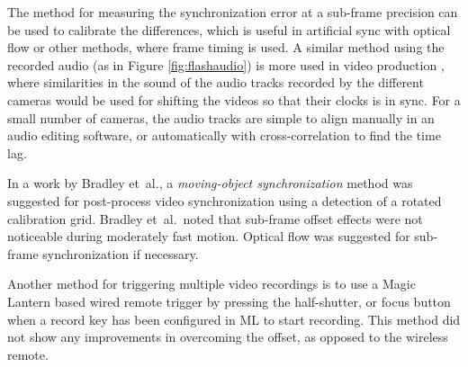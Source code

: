 


The method for measuring the synchronization error at a sub-frame precision can be used to calibrate the differences, which is useful in artificial sync with optical flow or other methods, where frame timing is used.
A similar method using the recorded audio (as in Figure \ref{fig:flashaudio}) is more used in video production \cite{pluraleyes,premierepromerge}, where similarities in the sound of the audio tracks recorded by the different cameras would be used for shifting the videos so that their clocks is in sync.
For a small number of cameras, the audio tracks are simple to align manually in an audio editing software, or automatically with cross-correlation to find the time lag.

In a work by Bradley et~al., a \emph{moving-object synchronization} method \cite{bradley2008markerless} was suggested for post-process video synchronization using a detection of a rotated calibration grid.
Bradley et~al.\ noted that sub-frame offset effects were not noticeable during moderately fast motion.
Optical flow was suggested for sub-frame synchronization if necessary.

Another method for triggering multiple video recordings is to use a Magic Lantern based wired remote trigger by pressing the half-shutter, or focus button when a record key has been configured in ML to start recording.
This method did not show any improvements in overcoming the offset, as opposed to the wireless remote.

